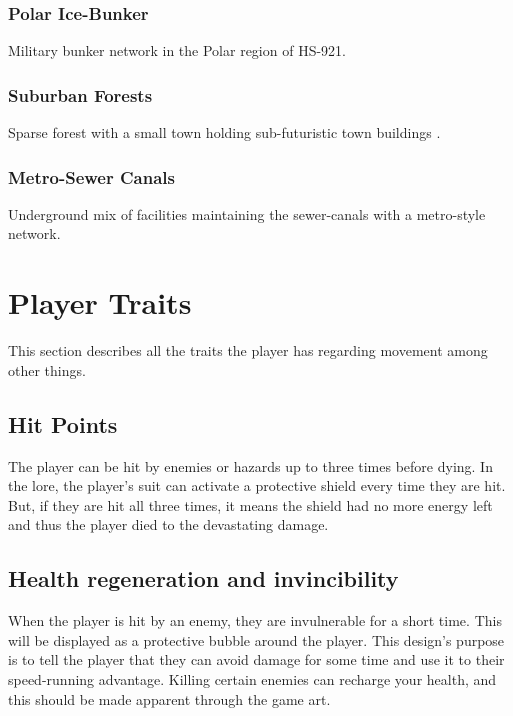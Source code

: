 \documentclass[12pt]{article}
\begin{document}
\subsubsection{Polar Ice-Bunker}

Military bunker network in the Polar region of HS-921. 

\subsubsection{Suburban Forests}

Sparse forest with a small town holding sub-futuristic town buildings .

\subsubsection{Metro-Sewer Canals}

Underground mix of facilities maintaining the sewer-canals with a metro-style network. 

\section{Player Traits}

This section describes all the traits the player has regarding movement among other things.

\subsection{Hit Points}

The player can be hit by enemies or hazards up to three times before dying. In the lore, the player's suit can activate a protective shield every time they are hit. But, if they are hit all three times, it means the shield had no more energy left and thus the player died to the devastating damage. 


\subsection{Health regeneration and invincibility}

When the player is hit by an enemy, they are invulnerable for a short time. This will be displayed as a protective bubble around the player. This design's purpose is to tell the player that they can avoid damage for some time and use it to their speed-running advantage. Killing certain enemies can recharge your health, and this should be made apparent through the game art. 
\end{document}
